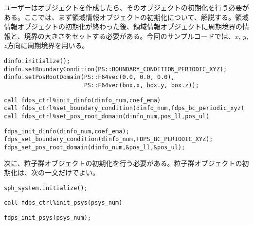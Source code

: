ユーザーはオブジェクトを作成したら、そのオブジェクトの初期化を行う必要がある。ここでは、まず領域情報オブジェクトの初期化について、解説する。領域情報オブジェクトの初期化が終わった後、領域情報オブジェクトに周期境界の情報と、境界の大きさをセットする必要がある。今回のサンプルコードでは、$x$, $y$, $z$方向に周期境界を用いる。
\ifCpp %
\begin{lstlisting}[caption=領域クラスの初期化]
dinfo.initialize();
dinfo.setBoundaryCondition(PS::BOUNDARY_CONDITION_PERIODIC_XYZ);
dinfo.setPosRootDomain(PS::F64vec(0.0, 0.0, 0.0),
                       PS::F64vec(box.x, box.y, box.z));
\end{lstlisting}
\endifCpp
\ifFtn %
\begin{lstlisting}[caption=領域情報オブジェクトの初期化]
call fdps_ctrl%init_dinfo(dinfo_num,coef_ema)
call fdps_ctrl%set_boundary_condition(dinfo_num,fdps_bc_periodic_xyz)
call fdps_ctrl%set_pos_root_domain(dinfo_num,pos_ll,pos_ul)
\end{lstlisting}
\endifFtn
\ifC %
\begin{lstlisting}[caption=領域情報オブジェクトの初期化]
fdps_init_dinfo(dinfo_num,coef_ema);
fdps_set_boundary_condition(dinfo_num,FDPS_BC_PERIODIC_XYZ);
fdps_set_pos_root_domain(dinfo_num,&pos_ll,&pos_ul);
\end{lstlisting}
\endifC


次に、粒子群オブジェクトの初期化を行う必要がある。粒子群オブジェクトの初期化は、次の一文だけでよい。
\ifCpp %
\begin{lstlisting}[caption=粒子群クラスの初期化]
sph_system.initialize();
\end{lstlisting}
\endifCpp
\ifFtn %
\begin{lstlisting}[caption=粒子群オブジェクトの初期化]
call fdps_ctrl%init_psys(psys_num)
\end{lstlisting}
\endifFtn
\ifC %
\begin{lstlisting}[caption=粒子群オブジェクトの初期化]
fdps_init_psys(psys_num);
\end{lstlisting}
\endifC

